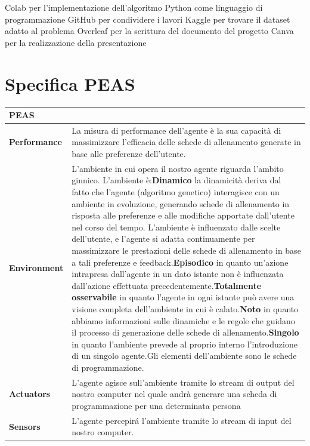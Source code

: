 \documentclass{book}
\begin{document}
                 Colab per l'implementazione dell'algoritmo
                  Python come linguaggio di programmazione
                  GitHub per condividere i lavori
                  Kaggle per trovare il dataset adatto al problema
                  Overleaf per la scrittura del documento del progetto
                Canva per la realizzazione della presentazione
             
\newpage
    \section{ Specifica PEAS} 
            \newline

                        \begin{tabular}{|p{1in}|p{4.1in}|} \hline 
                \multicolumn{2}{|p{2in}|}{\textbf{PEAS}} \\ \hline 
                \textbf{Performance} & La misura di performance dell'agente \`{e} la sua capacit\`{a} di massimizzare l'efficacia delle schede di allenamento generate in base alle preferenze dell'utente. \\ \hline 
                \textbf{Environment} & L'ambiente in cui opera il nostro agente riguarda l'ambito ginnico. L'ambiente \`{e}:\newline  \textbf{Dinamico} la dinamicità deriva dal fatto che l'agente (algoritmo genetico) interagisce con un ambiente in evoluzione, generando schede di allenamento in risposta alle preferenze e alle modifiche apportate dall'utente nel corso del tempo. L'ambiente è influenzato dalle scelte dell'utente, e l'agente si adatta continuamente per massimizzare le prestazioni delle schede di allenamento in base a tali preferenze e feedback.\newline  \textbf{Episodico }in quanto un'azione intrapresa dall'agente in un dato istante non \`{e} influenzata dall'azione effettuata precedentemente.\newline  \textbf{Totalmente osservabile }in quanto l'agente in ogni istante pu\`{o} avere una visione completa dell'ambiente in cui \`{e} calato.\newline   \textbf{Noto }in quanto abbiamo informazioni sulle dinamiche e le regole che guidano il processo di generazione delle schede di allenamento.\newline  \textbf{Singolo} in quanto l'ambiente prevede al proprio interno l'introduzione di un singolo agente.\newline Gli elementi dell'ambiente sono le schede di programmazione.\newline  \\ \hline 
                \textbf{Actuators} & L'agente agisce sull'ambiente tramite lo stream di output del nostro computer nel quale andr\`{a} generare una scheda di programmazione per una determinata persona \\ \hline 
                \textbf{Sensors} & L'agente percepir\'{a} l'ambiente tramite lo stream di input del nostro computer. \\ \hline 
            \end{tabular}
\newpage
\end{document}
